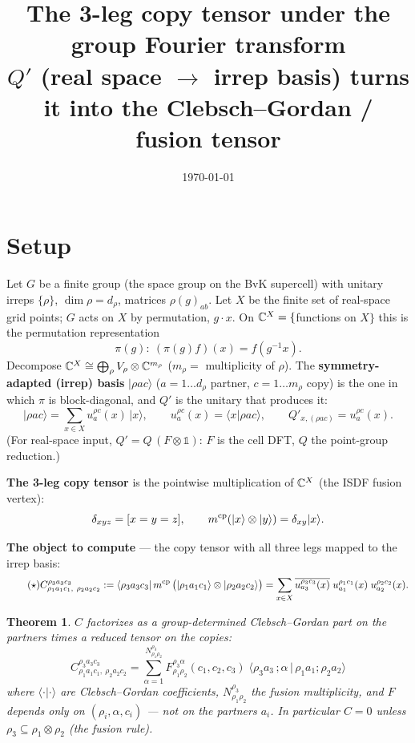 \documentclass[11pt]{article}
\title{\vspace{-1.2cm}The 3-leg copy tensor under the group Fourier transform\\[2pt]
\normalsize $Q'$ (real space $\to$ irrep basis) turns it into the Clebsch--Gordan / fusion tensor}
\author{}\date{\today}
\newcommand{\ket}[1]{\lvert #1\rangle}\newcommand{\bra}[1]{\langle #1\rvert}
\theoremstyle{plain}\newtheorem*{thm}{Theorem}\newtheorem*{lem}{Lemma}
\begin{document}
\maketitle\vspace{-0.7cm}

\section{Setup}
Let $G$ be a finite group (the space group on the BvK supercell) with unitary irreps $\{\rho\}$,
$\dim\rho=d_\rho$, matrices $\rho(g)_{ab}$. Let $X$ be the finite set of real-space grid points; $G$
acts on $X$ by permutation, $g\cdot x$. On $\mathbb C^X=\{$functions on $X\}$ this is the permutation
representation
\[
   \pi(g):\ (\pi(g)f)(x)=f(g^{-1}x).
\]
Decompose $\mathbb C^X\cong\bigoplus_\rho V_\rho\otimes\mathbb C^{m_\rho}$ ($m_\rho=$ multiplicity of $\rho$). The
\textbf{symmetry-adapted (irrep) basis} $\ket{\rho a c}$ ($a=1\dots d_\rho$ partner, $c=1\dots m_\rho$
copy) is the one in which $\pi$ is block-diagonal, and \textbf{$Q'$} is the unitary that produces it:
\[
   \ket{\rho a c}=\sum_{x\in X}u^{\rho c}_a(x)\,\ket{x},\qquad u^{\rho c}_a(x)=\langle x\ket{\rho a c},
   \qquad Q'_{x,(\rho a c)}=u^{\rho c}_a(x).
\]
(For real-space input, $Q'=Q\,(F\otimes\mathbb 1)$: $F$ is the cell DFT, $Q$ the point-group reduction.)

\textbf{The 3-leg copy tensor} is the pointwise multiplication of $\mathbb C^X$ (the ISDF fusion vertex):
\[
   \delta_{xyz}=[x=y=z],\qquad m^{\rm cp}(\ket x\otimes\ket y)=\delta_{xy}\ket x .
\]

\textbf{The object to compute} --- the copy tensor with all three legs mapped to the irrep basis:
\begin{equation}\tag{$\star$}
   C^{\rho_3 a_3 c_3}_{\rho_1 a_1 c_1,\ \rho_2 a_2 c_2}
   :=\bra{\rho_3 a_3 c_3}\,m^{\rm cp}\,\big(\ket{\rho_1 a_1 c_1}\otimes\ket{\rho_2 a_2 c_2}\big)
   =\sum_{x\in X}\overline{u^{\rho_3 c_3}_{a_3}(x)}\;u^{\rho_1 c_1}_{a_1}(x)\;u^{\rho_2 c_2}_{a_2}(x).
\end{equation}

\begin{thm}
$C$ factorizes as a \emph{group-determined Clebsch--Gordan part on the partners} times a
\emph{reduced tensor on the copies}:
\[
   \boxed{\;C^{\rho_3 a_3 c_3}_{\rho_1 a_1 c_1,\ \rho_2 a_2 c_2}
   =\sum_{\alpha=1}^{N^{\rho_3}_{\rho_1\rho_2}}
   F^{\rho_3\alpha}_{\rho_1\rho_2}(c_1,c_2,c_3)\;
   \big\langle \rho_3 a_3\,;\alpha\,\big|\,\rho_1 a_1;\rho_2 a_2\big\rangle\;}
\]
where $\langle\cdot|\cdot\rangle$ are Clebsch--Gordan coefficients, $N^{\rho_3}_{\rho_1\rho_2}$ the fusion
multiplicity, and $F$ depends only on $(\rho_i,\alpha,c_i)$ --- not on the partners $a_i$. In particular
$C=0$ unless $\rho_3\subseteq\rho_1\otimes\rho_2$ (the fusion rule).
\end{thm}
\end{document}
